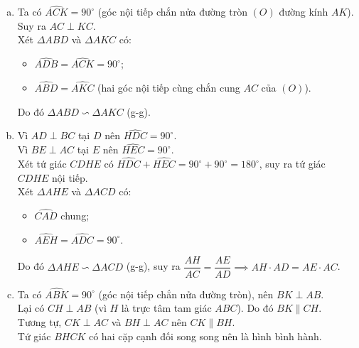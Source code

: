 \begin{bt}
{\begin{center}
\end{center}
\begin{enumerate}[a)]
	\item Ta có $\widehat{ACK} = 90^\circ$ (góc nội tiếp chắn nửa đường tròn $(O)$ đường kính $AK$).\\
	Suy ra $AC \perp KC$.\\
	Xét $\Delta ABD$ và $\Delta AKC$ có:
	\begin{itemize}
		\item $\widehat{ADB} = \widehat{ACK} = 90^\circ$;
		\item $\widehat{ABD} = \widehat{AKC}$ (hai góc nội tiếp cùng chắn cung $AC$ của $(O)$).
	\end{itemize}
	Do đó $\Delta ABD \backsim \Delta AKC$ (g-g).
	\item Vì $AD \perp BC$ tại $D$ nên $\widehat{HD C} = 90^\circ$.\\
	Vì $BE \perp AC$ tại $E$ nên $\widehat{HEC} = 90^\circ$.\\
	Xét tứ giác $CDHE$ có $\widehat{HDC} + \widehat{HEC} = 90^\circ + 90^\circ = 180^\circ$, suy ra tứ giác $CDHE$ nội tiếp.\\
	Xét $\Delta AHE$ và $\Delta ACD$ có:
	\begin{itemize}
		\item $\widehat{CAD}$ chung;
		\item $\widehat{AEH} = \widehat{ADC} = 90^\circ$.
	\end{itemize}
	Do đó $\Delta AHE \backsim \Delta ACD$ (g-g), suy ra $\dfrac{AH}{AC} = \dfrac{AE}{AD} \implies AH \cdot AD = AE \cdot AC$.
	\item Ta có $\widehat{ABK} = 90^\circ$ (góc nội tiếp chắn nửa đường tròn), nên $BK \perp AB$.\\
	Lại có $CH \perp AB$ (vì $H$ là trực tâm tam giác $ABC$). Do đó $BK \parallel CH$.\\
	Tương tự, $CK \perp AC$ và $BH \perp AC$ nên $CK \parallel BH$.\\
	Tứ giác $BHCK$ có hai cặp cạnh đối song song nên là hình bình hành.\\

\end{enumerate}}
\end{bt}
